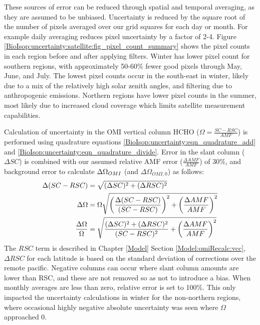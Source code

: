     These sources of error can be reduced through spatial and temporal averaging, as they are assumed to be unbiased.
    Uncertainty is reduced by the square root of the number of pixels averaged over our \lowhr grid squares for each day or month.
    For example daily averaging reduces pixel uncertainty by a factor of 2-4.
    Figure \ref{BioIsop:uncertainty:satellite:fig_pixel_count_summary} shows the pixel counts in each region before and after applying filters.
    Winter has lower pixel count for southern regions, with approximately 50-60\% fewer good pixels through May, June, and July.
    The lowest pixel counts occur in the south-east in winter, likely due to a mix of the relatively high solar zenith angles, and filtering due to anthropogenic emissions.
    Northern regions have lower pixel counts in the summer, most likely due to increased cloud coverage which limits satellite measurement capabilities.
    
    
    Calculation of uncertainty in the OMI vertical column HCHO ($\Omega  = \frac{SC - RSC}{AMF}$) is performed using quadrature equations \ref{BioIsop:uncertainty:eqn_quadrature_add} and \ref{BioIsop:uncertainty:eqn_quadrature_divide}.
    Error in the slant column ($\Delta SC$) is combined with our assumed relative AMF error ($\frac{\Delta AMF}{AMF}$) of 30\%, and background error to calculate $\Delta \Omega_{OMI}$ (and $\Delta \Omega_{OMI,0}$) as follows:
    \begin{align}
      \Delta (SC-RSC) & = \sqrt{(\Delta SC)^2 + (\Delta RSC)^2} \notag \\
      \Delta \Omega   & = \Omega \sqrt{ \left( \frac{\Delta (SC-RSC)}{(SC-RSC)} \right)^2 + \left( \frac{\Delta AMF}{AMF} \right)^2 } \notag \\
      \frac{\Delta \Omega}{\Omega} & = \sqrt{ \frac{ (\Delta SC)^2 + (\Delta RSC)^2}{(SC-RSC)^2} + \left( \frac{\Delta AMF}{AMF} \right)^2 } \label{BioIsop:uncertainty:satellite:eqn_VCC_uncertainty} 
    \end{align}
    The $RSC$ term is described in Chapter \ref{Model} Section \ref{Model:omiRecalc:vcc}, $\Delta RSC$ for each latitude is based on the standard deviation of corrections over the remote pacific.
    Negative columns can occur where slant column amounts are lower than RSC, and these are not removed so as not to introduce a bias.
    When monthly averages are less than zero, relative error is set to 100\%.
    This only impacted the uncertainty calculations in winter for the non-northern regions, where occasional highly negative absolute uncertainty was seen where $\Omega$ approached 0.
    
